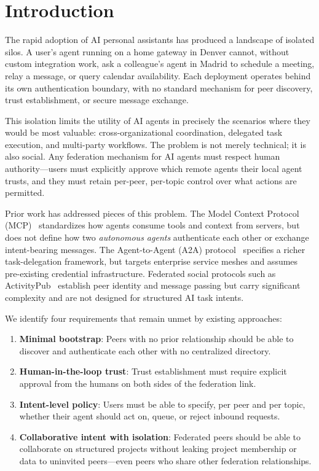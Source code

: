 \documentclass[conference]{IEEEtran}
\begin{document}
\section{Introduction}

The rapid adoption of AI personal assistants has produced a landscape of isolated silos. A user's agent running on a home gateway in Denver cannot, without custom integration work, ask a colleague's agent in Madrid to schedule a meeting, relay a message, or query calendar availability. Each deployment operates behind its own authentication boundary, with no standard mechanism for peer discovery, trust establishment, or secure message exchange.

This isolation limits the utility of AI agents in precisely the scenarios where they would be most valuable: cross-organizational coordination, delegated task execution, and multi-party workflows. The problem is not merely technical; it is also social. Any federation mechanism for AI agents must respect human authority---users must explicitly approve which remote agents their local agent trusts, and they must retain per-peer, per-topic control over what actions are permitted.

Prior work has addressed pieces of this problem. The Model Context Protocol (MCP)~\cite{mcp2024} standardizes how agents consume tools and context from servers, but does not define how two \emph{autonomous agents} authenticate each other or exchange intent-bearing messages. The Agent-to-Agent (A2A) protocol~\cite{a2a2025} specifies a richer task-delegation framework, but targets enterprise service meshes and assumes pre-existing credential infrastructure. Federated social protocols such as ActivityPub~\cite{activitypub} establish peer identity and message passing but carry significant complexity and are not designed for structured AI task intents.

We identify four requirements that remain unmet by existing approaches:

\begin{enumerate}
  \item \textbf{Minimal bootstrap}: Peers with no prior relationship should be able to discover and authenticate each other with no centralized directory.
  \item \textbf{Human-in-the-loop trust}: Trust establishment must require explicit approval from the humans on both sides of the federation link.
  \item \textbf{Intent-level policy}: Users must be able to specify, per peer and per topic, whether their agent should act on, queue, or reject inbound requests.
  \item \textbf{Collaborative intent with isolation}: Federated peers should be able to collaborate on structured projects without leaking project membership or data to uninvited peers---even peers who share other federation relationships.
\end{enumerate}
\end{document}
